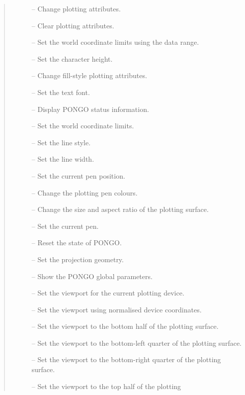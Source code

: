 \small
\begin {quote}
  \begin {description}
  \item [] -- Change plotting attributes.
  \item [] -- Clear plotting attributes.
  \item [] -- Set the world coordinate limits
    using the data range.
  \item [] -- Set the character height.
  \item [] -- Change fill-style plotting attributes.
  \item [] -- Set the text font.
  \item [] -- Display PONGO status information.
  \item [] -- Set the world coordinate limits.
  \item [] -- Set the line style.
  \item [] -- Set the line width.
  \item [] -- Set the current pen position.
  \item [] -- Change the plotting pen colours.
  \item [] -- Change the size and aspect ratio of the plotting
    surface.
  \item [] -- Set the current pen.
  \item [] -- Reset the state of PONGO.
  \item [] -- Set the projection geometry.
  \item [] -- Show the PONGO global parameters.
  \item [] -- Set the viewport for the current plotting device.
  \item [] -- Set the viewport using normalised device coordinates.
  \item [] -- Set the viewport to the bottom half of the plotting
    surface.
  \item [] -- Set the viewport to the bottom-left quarter of the
    plotting surface.
  \item [] -- Set the viewport to the bottom-right quarter of the
    plotting surface.
  \item [] -- Set the viewport to the top half of the plotting

\end{description}
\end{quote}
